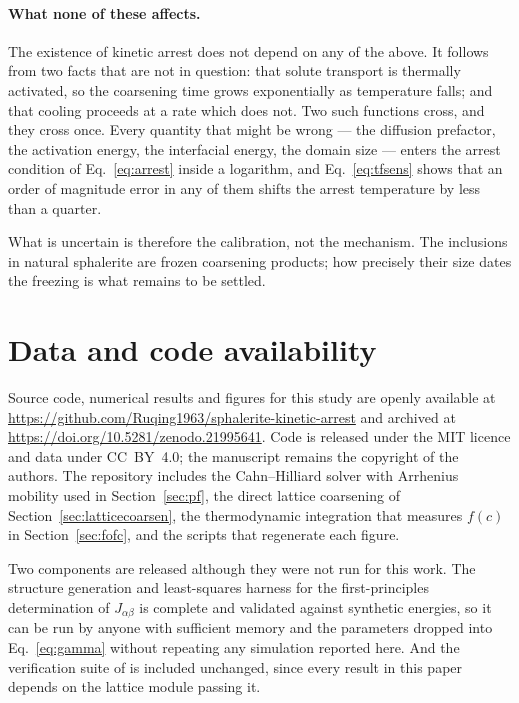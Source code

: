 \documentclass[preprint,12pt,authoryear]{elsarticle}
\begin{document}
\paragraph{What none of these affects.} The existence of kinetic arrest does not
depend on any of the above. It follows from two facts that are not in question:
that solute transport is thermally activated, so the coarsening time grows
exponentially as temperature falls; and that cooling proceeds at a rate which
does not. Two such functions cross, and they cross once. Every quantity that
might be wrong --- the diffusion prefactor, the activation energy, the
interfacial energy, the domain size --- enters the arrest condition of
Eq.~\eqref{eq:arrest} inside a logarithm, and Eq.~\eqref{eq:tfsens} shows that
an order of magnitude error in any of them shifts the arrest temperature by less
than a quarter.

What is uncertain is therefore the calibration, not the mechanism. The
inclusions in natural sphalerite are frozen coarsening products; how precisely
their size dates the freezing is what remains to be settled.

\section*{Data and code availability}
\label{sec:availability}
Source code, numerical results and figures for this study are openly available
at \url{https://github.com/Ruqing1963/sphalerite-kinetic-arrest} and
archived at \url{https://doi.org/10.5281/zenodo.21995641}. Code is
released under the MIT licence and data under CC~BY~4.0; the manuscript remains
the copyright of the authors. The repository includes the Cahn--Hilliard solver
with Arrhenius mobility used in Section~\ref{sec:pf}, the direct lattice
coarsening of Section~\ref{sec:latticecoarsen}, the thermodynamic integration
that measures $f(c)$ in Section~\ref{sec:fofc}, and the scripts that regenerate
each figure.

Two components are released although they were not run for this work. The
structure generation and least-squares harness for the first-principles
determination of $J_{\alpha\beta}$ is complete and validated against synthetic
energies, so it can be run by anyone with sufficient memory and the parameters
dropped into Eq.~\eqref{eq:gamma} without repeating any simulation reported
here. And the verification suite of \citet{yu2026} is included unchanged, since
every result in this paper depends on the lattice module passing it.
\end{document}

